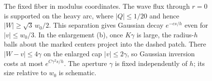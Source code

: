 \begin{figure}[!htbp]
\caption{The fixed fiber in modulus coordinates. The wave flux through
$r=0$ is supported on the heavy arc, where $|Q|\le1/20$ and hence
$|W|\ge\sqrt{3}\,w_0/2$. This separation gives Gaussian decay
$e^{-cs/h}$ even for $|v|\le w_0/3$. In the enlargement (b), once
$K\gamma$ is large, the radius-$h$ balls about the marked centers
project into the dashed patch. There $|W-v|\le4\gamma$ on the enlarged cap
$|v|\le2\gamma$, so Gaussian inversion costs at most $e^{C\gamma^2s/h}$.
The aperture $\gamma$ is fixed independently of $h$; its size relative
to $w_0$ is schematic.}
\label{fig:fiber}
\end{figure}
